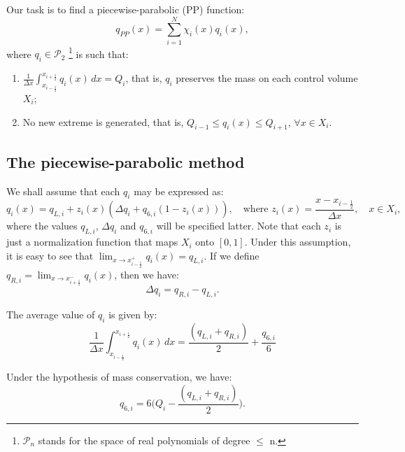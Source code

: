 Our task is to find a piecewise-parabolic (PP) 
function:
\begin{equation}
	\label{chp1-sec3-1-eq2}
	q_{PP}(x) = \sum_{i=1}^{N} \chi_i(x) q_i(x),
\end{equation}
where ${q}_i \in \mathcal{P}_2$
\footnote{$\mathcal{P}_n$ stands for the space of real polynomials of degree $\leq$ n.} 
is such that:
\begin{enumerate}
	\item $\frac{1}{\Delta x}\int_{x_{i-\frac{1}{2}}}^{x_{i+\frac{1}{2}}} {q}_i(x) \,dx = {Q}_i$,
	that is, $q_i$ preserves the mass on each control volume $X_i$;
	\item No new extreme is generated, that is, 
	${Q}_{i-1} \leq q_i(x) \leq {Q}_{i+1}$, $\forall x \in X_i$.
\end{enumerate}

\subsection{The piecewise-parabolic method}
\label{chp1-sec-recon-ppm}

We shall assume that each $q_i$ may be expressed as:
\begin{equation}
	\label{chp1-sec-recon-ppm-eq1}
	q_i(x) = q_{L, i} + z_i(x)(\Delta q_i + q_{6, i}(1-z_i(x))), 
	\quad \text{where }
	z_i(x) = \frac{x-x_{i-\frac{1}{2}}}{\Delta x},
	\quad x \in X_i,
\end{equation}
where the values $q_{L, i}$, $\Delta q_i$ and $q_{6, i}$  will be specified latter.
Note that each $z_i$ is just a normalization function that maps $X_i$ onto $[0,1]$.
Under this assumption, it is easy to see that 
$\lim_{x \to x_{i-\frac{1}{2}}^+} {q_i(x)} = q_{L, i}$.
If we define $q_{R, i} = \lim_{x \to x_{i+\frac{1}{2}}^-} {q_i(x)}$,
then we have:
\begin{equation}
	\label{chp1-sec-recon-ppm-eq2}
	\Delta q_i = q_{R, i} - q_{L, i}.
\end{equation}

The average value of $q_i$ is given by:
\begin{equation}
	\label{chp1-sec-recon-ppm-eq3}
	\frac{1}{\Delta x}\int_{x_{i-\frac{1}{2}}}^{x_{i+\frac{1}{2}}} {q}_i(x) \,dx
	= \frac{(q_{L,i} + q_{R,i})}{2} + \frac{q_{6,i}}{6}
\end{equation}

Under the hypothesis of mass conservation, we have:
\begin{equation}
	\label{chp1-sec-recon-ppm-eq4}
	q_{6,i} = 6\bigg(Q_i - \frac{(q_{L,i} + q_{R,i})}{2}\bigg).
\end{equation}

